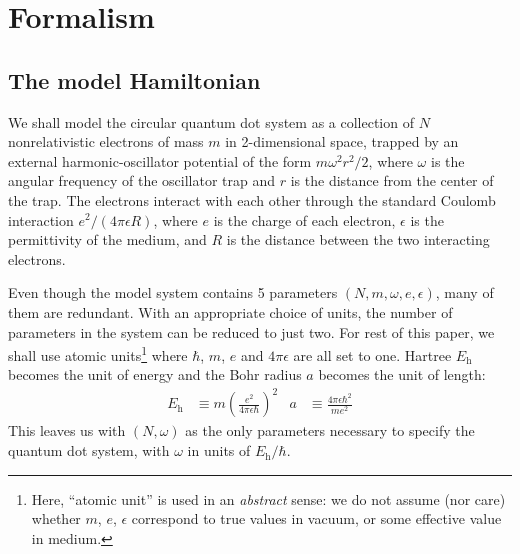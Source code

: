 \section{Formalism}
\label{sec:formalism}

\subsection{The model Hamiltonian}
\label{subsec:modelHamiltonian}

We shall model the circular quantum dot system as a collection of $N$ nonrelativistic electrons of mass $m$ in 2-dimensional space, trapped by an external harmonic-oscillator potential of the form $m \omega^2 r^2 / 2$, where $\omega$ is the angular frequency of the oscillator trap and $r$ is the distance from the center of the trap.  The electrons interact with each other through the standard Coulomb interaction $e^2 / (4 \pi \epsilon R)$, where $e$ is the charge of each electron, $\epsilon$ is the permittivity of the medium, and $R$ is the distance between the two interacting electrons.

Even though the model system contains 5 parameters $(N, m, \omega, e, \epsilon)$, many of them are redundant.  With an appropriate choice of units, the number of parameters in the system can be reduced to just two.  For rest of this paper, we shall use atomic units\footnote{Here, ``atomic unit'' is used in an \emph{abstract} sense: we do not assume (nor care) whether $m$, $e$, $\epsilon$ correspond to true values in vacuum, or some effective value in medium.} where $\hbar$, $m$, $e$ and $4 \pi \epsilon$ are all set to one.  Hartree $E_{\mathrm{h}}$ becomes the unit of energy and the Bohr radius $a$ becomes the unit of length:
\begin{align*}
  E_{\mathrm{h}} &\equiv m \left(\frac{e^2}{4 \pi \epsilon \hbar}\right)^2 &
  a &\equiv \frac{4 \pi \epsilon \hbar^2}{m e^2}
\end{align*}
This leaves us with $(N, \omega)$ as the only parameters necessary to specify the quantum dot system, with $\omega$ in units of $E_{\mathrm{h}} / \hbar$.

